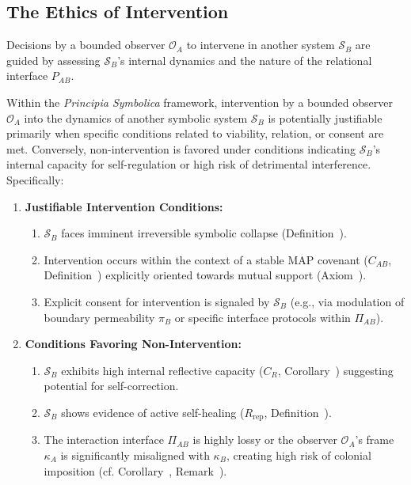 \subsection{The Ethics of Intervention}
\label{subsec:bk9_ethics_of_intervention}
Decisions by a bounded observer $\mathcal{O}_A$ to intervene in another system $\mathcal{S}_B$ are guided by assessing $\mathcal{S}_B$'s internal dynamics and the nature of the relational interface $P_{AB}$.
\begin{proposition}
\label{prop:bk9_criteria_for_ethical_intervention}
Within the \textit{Principia Symbolica} framework, intervention by a bounded observer $\mathcal{O}_A$ into the dynamics of another symbolic system $\mathcal{S}_B$ is potentially justifiable primarily when specific conditions related to viability, relation, or consent are met. Conversely, non-intervention is favored under conditions indicating $\mathcal{S}_B$'s internal capacity for self-regulation or high risk of detrimental interference. Specifically:
\begin{enumerate}
    \item \textbf{Justifiable Intervention Conditions:}
        \begin{enumerate}
            \item $\mathcal{S}_B$ faces imminent irreversible symbolic collapse (Definition~).
            \item Intervention occurs within the context of a stable MAP covenant ($C_{AB}$, Definition~) explicitly oriented towards mutual support (Axiom~).
            \item Explicit consent for intervention is signaled by $\mathcal{S}_B$ (e.g., via modulation of boundary permeability $\pi_B$ or specific interface protocols within $\Pi_{AB}$).
        \end{enumerate}
    \item \textbf{Conditions Favoring Non-Intervention:}
        \begin{enumerate}
            \item $\mathcal{S}_B$ exhibits high internal reflective capacity ($C_R$, Corollary~) suggesting potential for self-correction.
            \item $\mathcal{S}_B$ shows evidence of active self-healing ($R_{\text{rep}}$, Definition~).
            \item The interaction interface $\Pi_{AB}$ is highly lossy or the observer $\mathcal{O}_A$'s frame $\kappa_A$ is significantly misaligned with $\kappa_B$, creating high risk of colonial imposition (cf. Corollary~, Remark~).
        \end{enumerate}
\end{enumerate}
\end{proposition}
